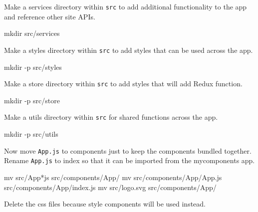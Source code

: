 \documentclass[]{book}
\newenvironment{Shaded}{\begin{snugshade}}{\end{snugshade}}
\newcommand{\FunctionTok}[1]{\textcolor[rgb]{0.00,0.00,0.00}{#1}}
\newcommand{\NormalTok}[1]{#1}
\begin{document}
Make a services directory within \texttt{src} to add additional
functionality to the app and reference other site APIs.

\begin{Shaded}
\begin{Highlighting}[]
\FunctionTok{mkdir}\NormalTok{ src/services}
\end{Highlighting}
\end{Shaded}

Make a styles directory within \texttt{src} to add styles that can be
used across the app.

\begin{Shaded}
\begin{Highlighting}[]
\FunctionTok{mkdir}\NormalTok{ -p src/styles}
\end{Highlighting}
\end{Shaded}

Make a store directory within \texttt{src} to add styles that will add
Redux function.

\begin{Shaded}
\begin{Highlighting}[]
\FunctionTok{mkdir}\NormalTok{ -p src/store}
\end{Highlighting}
\end{Shaded}

Make a utils directory within \texttt{src} for shared functions across
the app.

\begin{Shaded}
\begin{Highlighting}[]
\FunctionTok{mkdir}\NormalTok{ -p src/utils}
\end{Highlighting}
\end{Shaded}

Now move \texttt{App.js} to components just to keep the components
bundled together. Rename \texttt{App.js} to index so that it can be
imported from the mycomponents app.

\begin{Shaded}
\begin{Highlighting}[]
\FunctionTok{mv}\NormalTok{ src/App*js src/components/App/}
\FunctionTok{mv}\NormalTok{ src/components/App/App.js src/components/App/index.js}
\FunctionTok{mv}\NormalTok{ src/logo.svg src/components/App/}
\end{Highlighting}
\end{Shaded}

Delete the css files because style components will be used instead.
\end{document}
